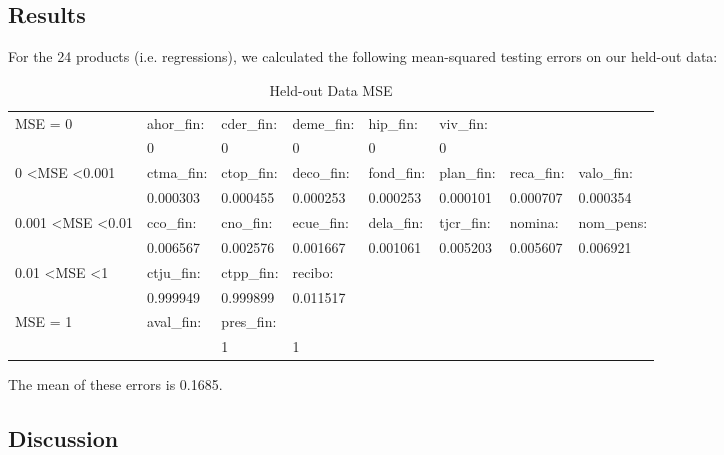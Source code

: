 \documentclass{article}
\begin{document}
\begin{spacing}{1}
\begin{large}
\subsection{Results}

For the 24 products (i.e. regressions), we calculated the following mean-squared testing errors on our held-out data:

\begin{table}[h]\footnotesize
	\centering
	\caption{Held-out Data MSE}
	\label{my-label}
	\begin{tabular}{llllllll}
		\hline
		MSE = 0                            & ahor\_fin:  & cder\_fin: & deme\_fin: & hip\_fin:  & viv\_fin:  &                     &            \\
		& 0                    & 0          & 0          & 0          & 0          &                     &            \\ \hline
		0 \textless MSE \textless 0.001      & ctma\_fin:          & ctop\_fin: & deco\_fin: & fond\_fin: & plan\_fin: & reca\_fin:  & valo\_fin: \\
		& 0.000303            & 0.000455   & 0.000253   & 0.000253   & 0.000101   &  0.000707             & 0.000354   \\ \hline
		0.001 \textless MSE \textless 0.01 & cco\_fin:           & cno\_fin:  & ecue\_fin: & dela\_fin: & tjcr\_fin: & nomina:             & nom\_pens: \\
		& 0.006567            & 0.002576   & 0.001667   & 0.001061   & 0.005203   & 0.005607            & 0.006921   \\ \hline
		0.01 \textless MSE \textless 1     & ctju\_fin:          & ctpp\_fin: & recibo:    &            &            &                     &            \\
		& 0.999949            & 0.999899   & 0.011517   &            &            &                     &            \\ \hline
		MSE = 1                            & aval\_fin:          & pres\_fin: &            &            &            &                     &\\            
		&                    & 1          &1           &            &            &                     & \\ 
		\hline         
	\end{tabular}
\end{table}
The mean of these errors is 0.1685.

\subsection{Discussion}


\end{large}
\end{spacing}
\end{document}
